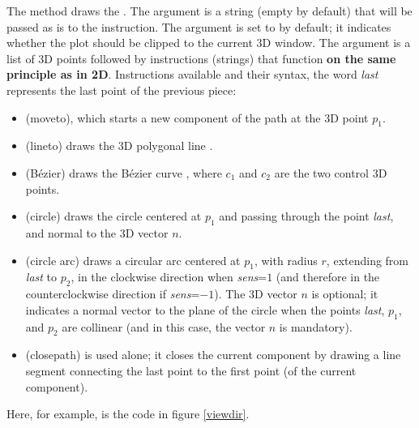 The method  draws the . The  argument is a string (empty by default) that will be passed as is to the \drawcmd instruction. The  argument is set to \false by default; it indicates whether the plot should be clipped to the current 3D window. The  argument is a list of 3D points followed by instructions (strings) that function \textbf{on the same principle as in 2D}. Instructions available and their syntax, the word \emph{last} represents the last point of the previous piece:
\begin{itemize}
    \item {} (moveto), which starts a new component of the path at the 3D point $p_1$.
    \item {} (lineto) draws the 3D polygonal line .
    \item {} (Bézier) draws the Bézier curve , where $c_1$ and $c_2$ are the two control 3D points.
    \item {} (circle) draws the circle centered at $p_1$ and passing through the point \emph{last}, and normal to the 3D vector $n$. 
    \item {} (circle arc) draws a circular arc centered at $p_1$, with radius $r$, extending from \emph{last} to $p_2$, in the clockwise direction when \emph{sens}=$1$ (and therefore in the counterclockwise direction if \emph{sens}=$-1$). The 3D vector $n$ is optional; it indicates a normal vector to the plane of the circle when the points \emph{last}, $p_1$, and $p_2$ are collinear (and in this case, the vector $n$ is mandatory).
    \item {} (closepath) is used alone; it closes the current component by drawing a line segment connecting the last point to the first point (of the current component).
\end{itemize}

Here, for example, is the code in figure \ref{viewdir}.

